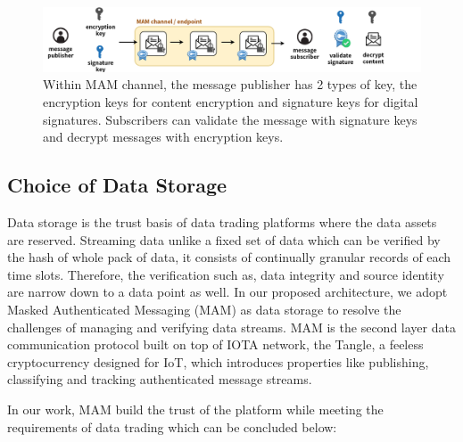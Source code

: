 \documentclass[conference]{IEEEtran}
\begin{document}
\begin{figure}[!t]
    \centering
    \includegraphics[width=\linewidth]{channel_and_key}
    \caption{Within MAM channel, the message publisher has 2 types of key, the encryption keys for content encryption and signature keys for digital signatures. Subscribers can validate the message with signature keys and decrypt messages with encryption keys.}
    \label{fig:channel_and_key}
\end{figure}


\subsection{Choice of Data Storage}
Data storage is the trust basis of data trading platforms where the data assets are reserved. Streaming data unlike a fixed set of data which can be verified by the hash of whole pack of data, it consists of continually granular records of each time slots. Therefore, the verification such as, data integrity and source identity are narrow down to a data point as well. In our proposed architecture, we adopt Masked Authenticated Messaging (MAM)\cite{MAM} as data storage to resolve the challenges of managing and verifying data streams. MAM is the second layer data communication protocol built on top of IOTA\cite{IOTAwhitepaper} network, the Tangle, a feeless cryptocurrency designed for IoT, which introduces properties like publishing, classifying and tracking authenticated message streams. 

In our work, MAM build the trust of the platform while meeting the requirements of data trading which can be concluded below:
\end{document}
